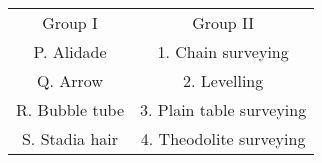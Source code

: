 \begin{table}[h]
        \centering
        \begin{tabular}{ c@{\hskip 1cm }c }
            Group I & Group II \\
            P. Alidade & 1. Chain surveying \\
            Q. Arrow & 2. Levelling \\
            R. Bubble tube & 3. Plain table surveying \\
            S. Stadia hair & 4. Theodolite surveying \\
        \end{tabular}
    \end{table}
